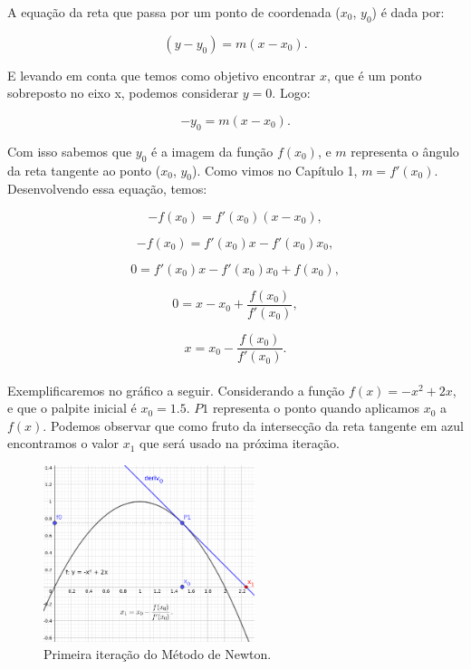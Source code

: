 A equação da reta que passa por um ponto de coordenada ($x_0$, $y_0$) é dada
por:

\begin{equation}
    (y - y_0) = m(x - x_0).
\end{equation}

E levando em conta que temos como objetivo encontrar $x$, que é um ponto
sobreposto no eixo x, podemos considerar $y=0$. Logo:

\begin{equation}
    -y_0=m(x-x_0).
\end{equation}

Com isso sabemos que $y_0$ é a imagem da função $f(x_0)$, e $m$ representa o
ângulo da reta tangente ao ponto ($x_0$, $y_0$). Como vimos no Capítulo 1,
 $m=f'(x_0)$. Desenvolvendo essa equação, temos:

\begin{equation}
    -f(x_0) = f'(x_0)(x-x_0),
\end{equation}

\begin{equation}
    -f(x_0) = f'(x_0)x - f'(x_0)x_0,
\end{equation}

\begin{equation}
    0 = f'(x_0)x - f'(x_0)x_0+f(x_0),
\end{equation}

\begin{equation}
    0 = x - x_0 + \frac{f(x_0)}{f'(x_0)},
\end{equation}

\begin{equation}
    x = x_0 - \frac {f(x_0)}{f'(x_0)}.
\end{equation}\\

Exemplificaremos no gráfico a seguir. Considerando a função $f(x)=-x^2+2x$, e
que o palpite inicial é $x_0=1.5$. $P1$ representa o ponto quando aplicamos
$x_0$ a $f(x)$. Podemos observar que como fruto da intersecção da reta tangente
em azul encontramos o valor $x_1$ que será usado na próxima iteração.

\begin{figure}[ht]
    \includegraphics[width=0.55\textwidth]
      {src/MetodoNewton_grafico_1.png}
    \centering
    \caption{
      Primeira iteração do Método de Newton.
     }
    \label{MetodoNewton_grafico_1}
\end{figure}


